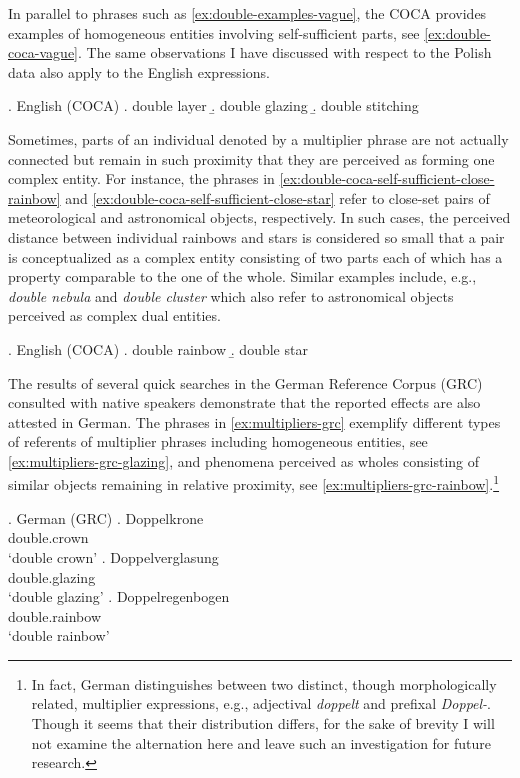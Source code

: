In parallel to phrases such as \ref{ex:double-examples-vague}, the COCA provides examples of homogeneous entities involving self-sufficient parts, see \ref{ex:double-coca-vague}. The same observations I have discussed with respect to the Polish data also apply to the English expressions.

\ex. English (COCA)\label{ex:double-coca-vague}
\a. double layer\label{ex:double-coca-vague-layer}
\b. double glazing\label{ex:double-coca-vague-glazing}
\b. double stitching\label{ex:double-coca-vague-stitching}

Sometimes, parts of an individual denoted by a multiplier phrase are not actually connected but remain in such proximity that they are perceived as forming one complex entity. For instance, the phrases in \ref{ex:double-coca-self-sufficient-close-rainbow} and \ref{ex:double-coca-self-sufficient-close-star} refer to close-set pairs of meteorological and astronomical objects, respectively. In such cases, the perceived distance between individual rainbows and stars is considered so small that a pair is conceptualized as a complex entity consisting of two parts each of which has a property comparable to the one of the whole. Similar examples include, e.g., \textit{double nebula} and \textit{double cluster} which also refer to astronomical objects perceived as complex dual entities.

\ex. English (COCA)\label{ex:double-coca-self-sufficient-close}
\a. double rainbow\label{ex:double-coca-self-sufficient-close-rainbow}
\b. double star\label{ex:double-coca-self-sufficient-close-star}

The results of several quick searches in the German Reference Corpus (GRC) consulted with native speakers demonstrate that the reported effects are also attested in German. The phrases in \ref{ex:multipliers-grc} exemplify different types of referents of multiplier phrases including homogeneous entities, see \ref{ex:multipliers-grc-glazing}, and phenomena perceived as wholes consisting of similar objects remaining in relative proximity, see \ref{ex:multipliers-grc-rainbow}.\footnote{In fact, German distinguishes between two distinct, though morphologically related, multiplier expressions, e.g., adjectival \textit{doppelt} and prefixal \textit{Doppel-}. Though it seems that their distribution differs, for the sake of brevity I will not examine the alternation here and leave such an investigation for future research.}

\ex. German (GRC)\label{ex:multipliers-grc}
\ag. Doppelkrone\\
double.crown\\
`double crown'\label{ex:multipliers-grc-crown}
\bg. Doppelverglasung\\
double.glazing\\
`double glazing'\label{ex:multipliers-grc-glazing}
\bg. Doppelregenbogen\\
double.rainbow\\
`double rainbow'\label{ex:multipliers-grc-rainbow}

